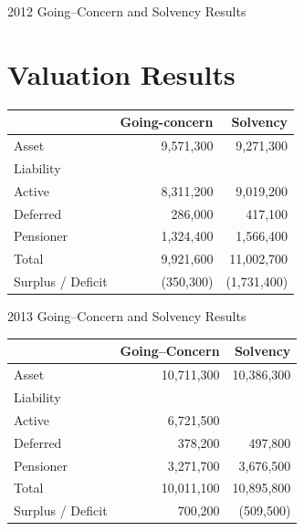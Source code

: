 \documentclass{beamer}
\begin{document}
\begin{frame}{2012 Going--Concern and Solvency Results}

\section{Valuation Results}

\begin{table}[ht]
\def\arraystretch{1.2}
\begin{tabular}{l r r}
\hline
& Going-concern & Solvency \\ \hline
Asset & 9,571,300  & 9,271,300 \\
Liability & & \\
\hspace{2mm} Active & 8,311,200 & 9,019,200 \\ 
\hspace{2mm} Deferred & 286,000 & 417,100 \\
\hspace{2mm} Pensioner  & 1,324,400 & 1,566,400 \\
\hspace{2mm} Total & 9,921,600 & 11,002,700 \\ \hline
Surplus / Deficit & (350,300) & (1,731,400) \\ \hline
\end{tabular}
\end{table}

\end{frame}

\begin{frame}{2013 Going--Concern and Solvency Results}

\begin{table}[ht]
\def\arraystretch{1.2}
\begin{tabular}{l r r}
\hline 
& Going--Concern & Solvency \\ \hline
Asset & 10,711,300 & 10,386,300 \\ 
Liability & & \\
\hspace{2mm} Active & 6,721,500 \\ 
\hspace{2mm} Deferred & 378,200 & 497,800 \\ 
\hspace{2mm} Pensioner & 3,271,700 & 3,676,500 \\ 
\hspace{2mm} Total & 10,011,100 & 10,895,800 \\ \hline
Surplus / Deficit & 700,200 & (509,500) \\ \hline 
\end{tabular}
\end{table}

\end{frame}
\end{document}
